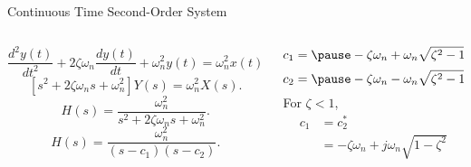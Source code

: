 \begin{frame}[t]{Continuous Time  Second-Order System}
    \begin{columns}[t]
        \begin{column}{6cm}
            \begin{equation*}
                \dfrac{d^2y(t)}{dt^2} + 2\zeta\omega_n\dfrac{dy(t)}{dt} + \omega_n^2y(t) = \omega_n^2x(t).
            \end{equation*}
            \pause
            {
                \begin{equation*}
                    \left[s^2 + 2\zeta\omega_ns + \omega_n^2\right]Y(s) = \omega_n^2X(s).
                \end{equation*}
            }
            \pause
            {
                \begin{equation*}
                    H(s) = \dfrac{\omega_n^2}{s^2 + 2\zeta\omega_ns + \omega_n^2}.
                \end{equation*}
            }
            \pause
            {
                \begin{equation*}
                    H(s) = \dfrac{\omega_n^2}{(s - c_1)(s - c_2)}.
                \end{equation*}
            }

        \end{column}
        \begin{column}{4cm}
            {
                \begin{equation*}
                    c_1 =\pause -\zeta\omega_n + \omega_n\sqrt{\zeta^2 - 1}
                \end{equation*}
            }
            \vspace{-0.2in}
            {
                \begin{equation*}
                    c_2 =\pause -\zeta\omega_n - \omega_n\sqrt{\zeta^2 - 1}
                \end{equation*}
            }
            For $\zeta < 1$,
            \begin{equation*}
                \begin{split}
                    c_1&=c_2^\ast\\
                    &= -\zeta\omega_n + j\omega_n\sqrt{1-\zeta^2}\\
                \end{split}
            \end{equation*}

        \end{column}
    \end{columns}

\end{frame}

